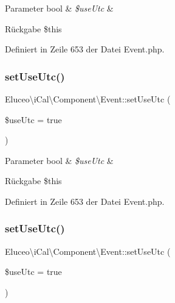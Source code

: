 \begin{DoxyParams}[1]{Parameter}
bool & {\em \$use\+Utc} & \\
\hline
\end{DoxyParams}
\begin{DoxyReturn}{Rückgabe}
\$this 
\end{DoxyReturn}


Definiert in Zeile 653 der Datei Event.\+php.

\mbox{\label{class_eluceo_1_1i_cal_1_1_component_1_1_event_ad086e385a56e162445e662ccce2715b9}} 
\subsubsection{\texorpdfstring{set\+Use\+Utc()}{setUseUtc()}\hspace{0.1cm}{\footnotesize\ttfamily [2/3]}}
{\footnotesize\ttfamily Eluceo\textbackslash{}i\+Cal\textbackslash{}\+Component\textbackslash{}\+Event\+::set\+Use\+Utc (\begin{DoxyParamCaption}\item[{}]{\$use\+Utc = {\ttfamily true} }\end{DoxyParamCaption})}


\begin{DoxyParams}[1]{Parameter}
bool & {\em \$use\+Utc} & \\
\hline
\end{DoxyParams}
\begin{DoxyReturn}{Rückgabe}
\$this 
\end{DoxyReturn}


Definiert in Zeile 653 der Datei Event.\+php.

\mbox{\label{class_eluceo_1_1i_cal_1_1_component_1_1_event_ad086e385a56e162445e662ccce2715b9}} 
\subsubsection{\texorpdfstring{set\+Use\+Utc()}{setUseUtc()}\hspace{0.1cm}{\footnotesize\ttfamily [3/3]}}
{\footnotesize\ttfamily Eluceo\textbackslash{}i\+Cal\textbackslash{}\+Component\textbackslash{}\+Event\+::set\+Use\+Utc (\begin{DoxyParamCaption}\item[{}]{\$use\+Utc = {\ttfamily true} }\end{DoxyParamCaption})}


